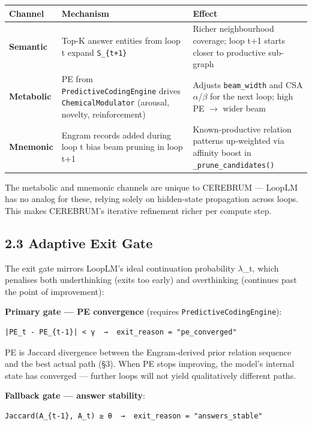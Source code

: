 \begin{table}[h]
\small\centering
\begin{tabular}{lll}
\toprule
Channel & Mechanism & Effect \\
\midrule
\textbf{Semantic} & Top-K answer entities from loop t expand \texttt{S\_\{t+1\}} & Richer neighbourhood coverage; loop t+1 starts closer to productive sub-graph \\
\textbf{Metabolic} & PE from \texttt{PredictiveCodingEngine} drives \texttt{ChemicalModulator} (arousal, novelty, reinforcement) & Adjusts \texttt{beam\_width} and CSA $\alpha$/$\beta$ for the next loop; high PE $\to$ wider beam \\
\textbf{Mnemonic} & Engram records added during loop t bias beam pruning in loop t+1 & Known-productive relation patterns up-weighted via affinity boost in \texttt{\_prune\_candidates()} \\
\bottomrule
\end{tabular}
\end{table}


The metabolic and mnemonic channels are unique to CEREBRUM --- LoopLM has no analog for these, relying solely on hidden-state propagation across loops. This makes CEREBRUM's iterative refinement richer per compute step.

\subsection*{2.3 Adaptive Exit Gate}

The exit gate mirrors LoopLM's ideal continuation probability $\lambda$_t, which penalises both underthinking (exits too early) and overthinking (continues past the point of improvement):

\textbf{Primary gate --- PE convergence} (requires \texttt{PredictiveCodingEngine}):
\begin{lstlisting}
|PE_t - PE_{t-1}| < γ  →  exit_reason = "pe_converged"
\end{lstlisting}

PE is Jaccard divergence between the Engram-derived prior relation sequence and the best actual path (§3). When PE stops improving, the model's internal state has converged --- further loops will not yield qualitatively different paths.

\textbf{Fallback gate --- answer stability}:
\begin{lstlisting}
Jaccard(A_{t-1}, A_t) ≥ θ  →  exit_reason = "answers_stable"
\end{lstlisting}

